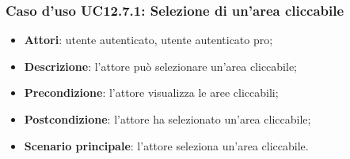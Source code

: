 \subsubsection{Caso d'uso UC12.7.1: Selezione di un'area cliccabile}
\begin{itemize}
\item \textbf{Attori}: utente autenticato, utente autenticato pro;
\item \textbf{Descrizione}: l'attore può selezionare un'area cliccabile;
\item \textbf{Precondizione}: l'attore visualizza le aree cliccabili;
\item \textbf{Postcondizione}: l'attore ha selezionato un'area cliccabile;
\item \textbf{Scenario principale}: l'attore seleziona un'area cliccabile.
\end{itemize}